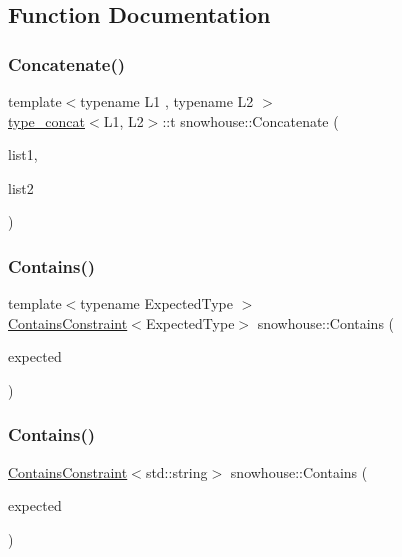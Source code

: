 \subsection{Function Documentation}
\mbox{\label{namespacesnowhouse_a458f016380e67dc5dff8e5ded8c87bd9}} 
\subsubsection{\texorpdfstring{Concatenate()}{Concatenate()}}
{\footnotesize\ttfamily template$<$typename L1 , typename L2 $>$ \\
\mbox{\hyperlink{structsnowhouse_1_1type__concat}{type\+\_\+concat}}$<$L1, L2$>$\+::t snowhouse\+::\+Concatenate (\begin{DoxyParamCaption}\item[{const L1 \&}]{list1,  }\item[{const L2 \&}]{list2 }\end{DoxyParamCaption})\hspace{0.3cm}{\ttfamily [inline]}}

\mbox{\label{namespacesnowhouse_ac66321592f0a30a5c82bfc0a6bb9c43e}} 
\subsubsection{\texorpdfstring{Contains()}{Contains()}\hspace{0.1cm}{\footnotesize\ttfamily [1/2]}}
{\footnotesize\ttfamily template$<$typename Expected\+Type $>$ \\
\mbox{\hyperlink{structsnowhouse_1_1ContainsConstraint}{Contains\+Constraint}}$<$Expected\+Type$>$ snowhouse\+::\+Contains (\begin{DoxyParamCaption}\item[{const Expected\+Type \&}]{expected }\end{DoxyParamCaption})\hspace{0.3cm}{\ttfamily [inline]}}

\mbox{\label{namespacesnowhouse_a4e7266e0604ebf2fc23d65e2c913af7e}} 
\subsubsection{\texorpdfstring{Contains()}{Contains()}\hspace{0.1cm}{\footnotesize\ttfamily [2/2]}}
{\footnotesize\ttfamily \mbox{\hyperlink{structsnowhouse_1_1ContainsConstraint}{Contains\+Constraint}}$<$std\+::string$>$ snowhouse\+::\+Contains (\begin{DoxyParamCaption}\item[{const char $\ast$}]{expected }\end{DoxyParamCaption})\hspace{0.3cm}{\ttfamily [inline]}}

